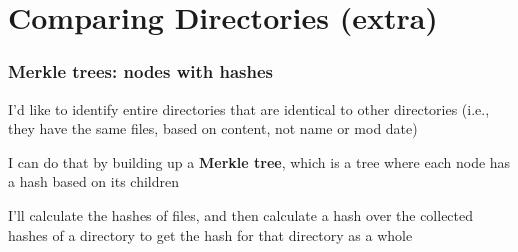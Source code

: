 \documentclass[compress,t,11pt]{beamer}
\begin{document}
\section{Comparing Directories (extra)}
\begin{frame}
    \frametitle{Merkle trees: nodes with hashes}
    { I'd like to identify entire directories that are identical 
    to other directories (i.e., they have the same files, based on content, not 
    name or mod date) \\}\par
    \vspace{2\baselineskip}
    { I can do that by building up a {\bf Merkle tree}, which is 
    a tree where each node has a hash based on its children \\}\par
    \vspace{2\baselineskip}
    { I'll calculate the hashes of files, and then calculate a hash 
    over the collected hashes of a directory to get the hash for that directory as 
    a whole \\}
\end{frame}
\end{document}
